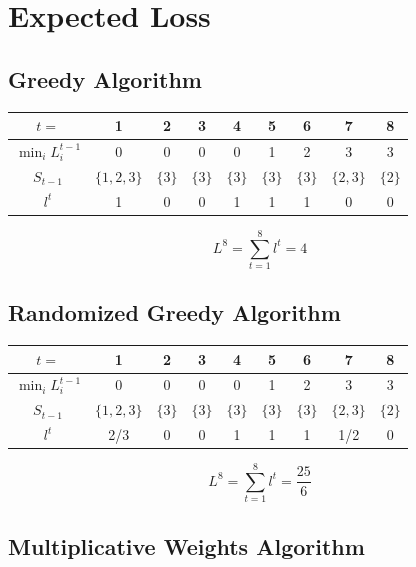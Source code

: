 




\section{Expected Loss}
\subsection{Greedy Algorithm}
\begin{tabular}{ |c|c|c|c|c|c|c|c|c| }
    \hline
    $t=$ & 1 & 2 & 3 & 4 & 5 & 6 & 7 & 8 \\ 
    \hline
    $\min_i L_i^{t-1}$  & 0 & 0 & 0 & 0 & 1 & 2 & 3 & 3 \\  
    $S_{t-1}$  & $\{1,2,3\}$ & $\{3\}$ & $\{3\}$ & $\{3\}$ 
    & $\{3\}$ & $\{3\}$ & $\{2,3\}$ & $\{2\}$ \\  
    $l^t$ & 1 & 0 & 0 & 1 & 1 & 1 & 0 & 0 \\
    \hline
\end{tabular}
\[L^8=\sum_{t=1}^{8}l^t=4\]

\subsection{Randomized Greedy Algorithm}
\begin{tabular}{ |c|c|c|c|c|c|c|c|c| }
    \hline
    $t=$ & 1 & 2 & 3 & 4 & 5 & 6 & 7 & 8 \\ 
    \hline
    $\min_i L_i^{t-1}$  & 0 & 0 & 0 & 0 & 1 & 2 & 3 & 3 \\  
    $S_{t-1}$  & $\{1,2,3\}$ & $\{3\}$ & $\{3\}$ & $\{3\}$ 
    & $\{3\}$ & $\{3\}$ & $\{2,3\}$ & $\{2\}$ \\  
    $l^t$ & 2/3 & 0 & 0 & 1 & 1 & 1 & 1/2 & 0 \\
    \hline
\end{tabular}
\[L^8=\sum_{t=1}^{8}l^t=\frac{25}{6}\]
\subsection{Multiplicative Weights Algorithm}

